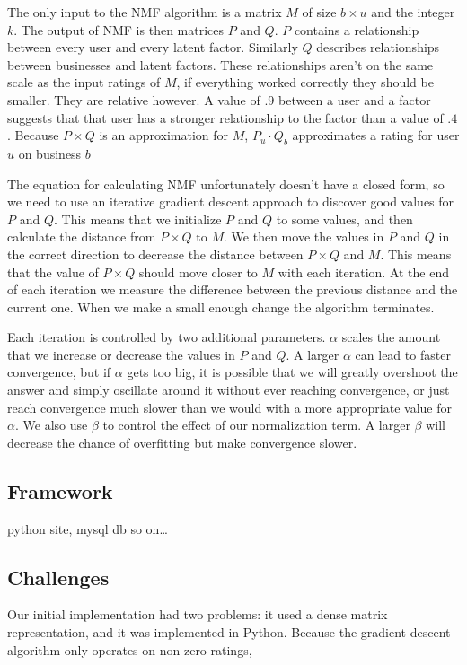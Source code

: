 The only input to the NMF algorithm is a matrix $M$ of size $b \times u$ and the
integer $k$. The output of NMF is then matrices $P$ and $Q$. $P$ contains a
relationship between every user and every latent factor. Similarly $Q$ describes
relationships between businesses and latent factors. These relationships aren't
on the same scale as the input ratings of $M$, if everything worked correctly
they should be smaller. They are relative however. A value of $.9$ between a
user and a factor suggests that that user has a stronger relationship to the
factor than a value of $.4$. Because $P \times Q$ is an approximation for $M$,
$P_u \cdot Q_b$ approximates a rating for user $u$ on business $b$

The equation for calculating NMF unfortunately doesn't have a closed form, so we
need to use an iterative gradient descent approach to discover good values for
$P$ and $Q$. This means that we initialize $P$ and $Q$ to some values, and then
calculate the distance from $P \times Q$ to $M$. We then move the values in $P$
and $Q$ in the correct direction to decrease the distance between $P \times Q$
and $M$. This means that the value of $P \times Q$ should move closer to $M$
with each iteration. At the end of each iteration we measure the difference
between the previous distance and the current one. When we make a small enough
change the algorithm terminates.


Each iteration is controlled by two additional parameters. $\alpha$ scales the
amount that we increase or decrease the values in $P$ and $Q$. A larger $\alpha$
can lead to faster convergence, but if $\alpha$ gets too big, it is possible that
we will greatly overshoot the answer and simply oscillate around it without ever
reaching convergence, or just reach convergence much slower than we would with a
more appropriate value for $\alpha$. We also use $\beta$ to control the effect
of our normalization term. A larger $\beta$ will decrease the chance of
overfitting but make convergence slower.

\subsection{Framework}

python site, mysql db so on\ldots

\subsection{Challenges}

Our initial implementation had two problems: it used a dense matrix
representation, and it was implemented in Python. Because the gradient descent
algorithm only operates on non-zero ratings, 
